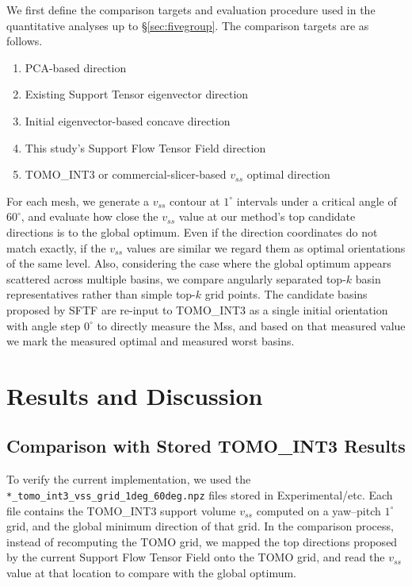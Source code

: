 \documentclass[11pt,a4paper]{article}
\begin{document}
We first define the comparison targets and evaluation procedure used in the quantitative analyses up to \S\ref{sec:fivegroup}.
The comparison targets are as follows.

\begin{enumerate}
\item PCA-based direction
\item Existing Support Tensor eigenvector direction
\item Initial eigenvector-based concave direction
\item This study's Support Flow Tensor Field direction
\item TOMO\_INT3 or commercial-slicer-based $v_{ss}$ optimal direction
\end{enumerate}

For each mesh, we generate a $v_{ss}$ contour at $1^\circ$ intervals under a critical angle of $60^\circ$,
and evaluate how close the $v_{ss}$ value at our method's top candidate directions is to the global optimum.
Even if the direction coordinates do not match exactly, if the $v_{ss}$ values are similar we regard them as optimal orientations of the same level.
Also, considering the case where the global optimum appears scattered across multiple basins,
we compare angularly separated top-$k$ basin representatives rather than simple top-$k$ grid points.
The candidate basins proposed by SFTF are re-input to TOMO\_INT3 as a single initial orientation with angle step $0^\circ$
to directly measure the Mss,
and based on that measured value we mark the measured optimal and measured worst basins.

\section{Results and Discussion}

\subsection{Comparison with Stored TOMO\_INT3 Results}

To verify the current implementation, we used the
\texttt{*\_tomo\_int3\_vss\_grid\_1deg\_60deg.npz} files stored in Experimental/etc.
Each file contains the TOMO\_INT3 support volume $v_{ss}$ computed on a yaw--pitch $1^\circ$ grid,
and the global minimum direction of that grid.
In the comparison process, instead of recomputing the TOMO grid,
we mapped the top directions proposed by the current Support Flow Tensor Field onto the TOMO grid,
and read the $v_{ss}$ value at that location to compare with the global optimum.
\end{document}
